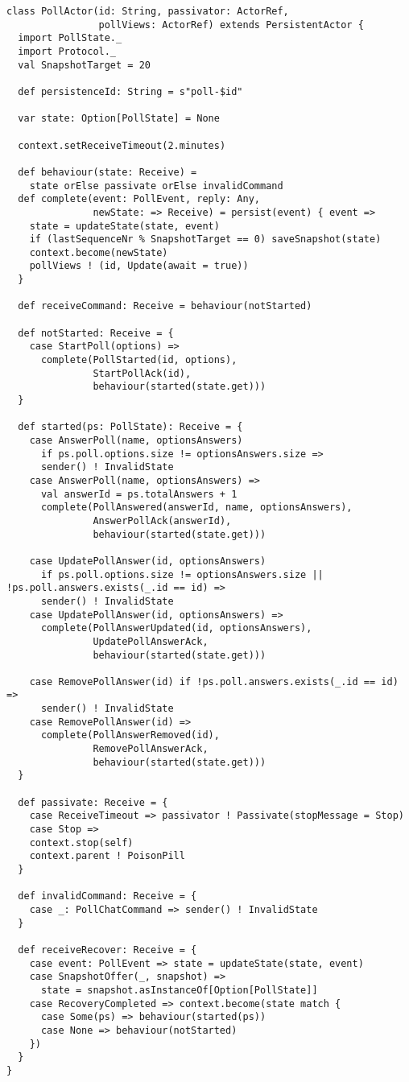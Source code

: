 \begin{lstlisting}[style=listing, caption={Персистентен актьор за анкета}]
class PollActor(id: String, passivator: ActorRef,
                pollViews: ActorRef) extends PersistentActor {
  import PollState._
  import Protocol._
  val SnapshotTarget = 20
  
  def persistenceId: String = s"poll-$id"
  
  var state: Option[PollState] = None
  
  context.setReceiveTimeout(2.minutes)
  
  def behaviour(state: Receive) =
    state orElse passivate orElse invalidCommand
  def complete(event: PollEvent, reply: Any,
               newState: => Receive) = persist(event) { event =>
    state = updateState(state, event)
    if (lastSequenceNr % SnapshotTarget == 0) saveSnapshot(state)
    context.become(newState)
    pollViews ! (id, Update(await = true))
  }
  
  def receiveCommand: Receive = behaviour(notStarted)
  
  def notStarted: Receive = {
    case StartPoll(options) =>
      complete(PollStarted(id, options),
               StartPollAck(id),
               behaviour(started(state.get)))
  }
  
  def started(ps: PollState): Receive = {
    case AnswerPoll(name, optionsAnswers)
      if ps.poll.options.size != optionsAnswers.size =>
      sender() ! InvalidState
    case AnswerPoll(name, optionsAnswers) =>
      val answerId = ps.totalAnswers + 1
      complete(PollAnswered(answerId, name, optionsAnswers),
               AnswerPollAck(answerId),
               behaviour(started(state.get)))
    
    case UpdatePollAnswer(id, optionsAnswers)
      if ps.poll.options.size != optionsAnswers.size || !ps.poll.answers.exists(_.id == id) =>
      sender() ! InvalidState
    case UpdatePollAnswer(id, optionsAnswers) =>
      complete(PollAnswerUpdated(id, optionsAnswers),
               UpdatePollAnswerAck,
               behaviour(started(state.get)))
    
    case RemovePollAnswer(id) if !ps.poll.answers.exists(_.id == id) =>
      sender() ! InvalidState
    case RemovePollAnswer(id) =>
      complete(PollAnswerRemoved(id),
               RemovePollAnswerAck,
               behaviour(started(state.get)))
  }
  
  def passivate: Receive = {
    case ReceiveTimeout => passivator ! Passivate(stopMessage = Stop)
    case Stop =>
    context.stop(self)
    context.parent ! PoisonPill
  }
  
  def invalidCommand: Receive = {
    case _: PollChatCommand => sender() ! InvalidState
  }
  
  def receiveRecover: Receive = {
    case event: PollEvent => state = updateState(state, event)
    case SnapshotOffer(_, snapshot) =>
      state = snapshot.asInstanceOf[Option[PollState]]
    case RecoveryCompleted => context.become(state match {
      case Some(ps) => behaviour(started(ps))
      case None => behaviour(notStarted)
    })
  }
}
\end{lstlisting}

